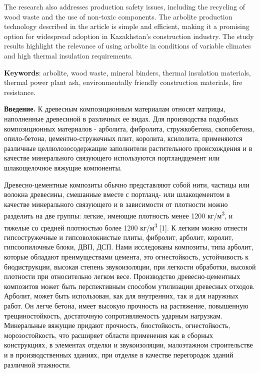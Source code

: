 The research also addresses production safety issues, including the
recycling of wood waste and the use of non-toxic components. The
arbolite production technology described in the article is simple and
efficient, making it a promising option for widespread adoption in
Kazakhstan's construction industry. The study results highlight the
relevance of using arbolite in conditions of variable climates and high
thermal insulation requirements.

{\bfseries Keywords}: arbolite, wood waste, mineral binders, thermal
insulation materials, thermal power plant ash, environmentally friendly
construction materials, fire resistance.

\begin{multicols}{2}
{\bfseries Введение.} К древесным композиционным материалам относят
матрицы, наполненные древесиной в различных ее видах. Для производства
подобных композиционных материалов - арболита, фибролита, стружкобетона,
скопобетона, опило-бетона, цементно-стружечных плит, королита,
ксилолита, применяются различные целлюлозосодержащие заполнители
растительного происхождения и в качестве минерального связующего
используются портландцемент или шлакощелочное вяжущие компоненты.

Древесно-цементные композиты обычно представляют собой нити, частицы или
волокна древесины, смешанные вместе с портланд- или шлакоцементом в
качестве минерального связующего и в зависимости от плотности можно
разделить на две группы: легкие, имеющие плотность менее 1200
кг/м\textsuperscript{3}, и тяжелые со средней плотностью более 1200
кг/м\textsuperscript{3} {[}1{]}. К легким можно отнести гипсостружечные
и гипсоволокнистые плиты, фибролит, арболит, королит, гипсоопилочные
блоки, ДВП, ДСП. Нами исследованы композиты, типа арболит, которые
обладают преимуществами цемента, это огнестойкость, устойчивость к
биодиструкции, высокая степень звукоизоляции, при легкости обработки,
высокой плотности при относительно легком весе. Производство
древесно-цементных композитов может быть перспективным способом
утилизации древесных отходов. Арболит, может быть использован, как для
внутренних, так и для наружных работ. Он легче бетона, имеет высокую
прочность на растяжение, повышенную трещиностойкость, достаточную
сопротивляемость ударным нагрузкам. Минеральные вяжущие придают
прочность, биостойкость, огнестойкость, морозостойкость, что расширяет
области применения как в сборных конструкциях, в элементах отделки и
звукоизоляции, малоэтажном строительстве и в производственных зданиях,
при отделке в качестве перегородок зданий различной этажности.


\end{multicols}
